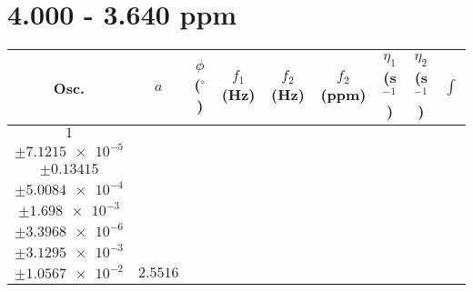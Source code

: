 \documentclass[8pt]{article}
\begin{document}
\section*{4.000 - 3.640 ppm}
\begin{longtable}[l]{c c c c c c c c c}
\toprule
Osc. & $a$ & $\phi$ ($^{\circ}$) & $f_1$ (Hz) & $f_2$ (Hz) & $f_2$ (ppm) & $\eta_1$ (s$^{-1}$) & $\eta_2$ (s$^{-1}$) & $\int$\\
\midrule
$\num{1}$ & \begin{tabular}[c]{@{}c@{}}$\num{3.0515e-2}$ \\ $\pm\num{7.1215e-5}$\end{tabular} & \begin{tabular}[c]{@{}c@{}}$\num{-0.26227}$ \\ $\pm\num{0.13415}$\end{tabular} & \begin{tabular}[c]{@{}c@{}}$\num{-9.0998}$ \\ $\pm\num{5.0084e-4}$\end{tabular} & \begin{tabular}[c]{@{}c@{}}$\num{1.8485e+3}$ \\ $\pm\num{1.698e-3}$\end{tabular} & \begin{tabular}[c]{@{}c@{}}$\num{3.6979}$ \\ $\pm\num{3.3968e-6}$\end{tabular} & \begin{tabular}[c]{@{}c@{}}$\num{1.1686}$ \\ $\pm\num{3.1295e-3}$\end{tabular} & \begin{tabular}[c]{@{}c@{}}$\num{4.2415}$ \\ $\pm\num{1.0567e-2}$\end{tabular} & $\num{2.5516}$\\

\end{longtable}
\end{document}
